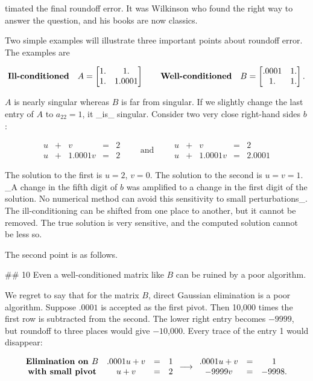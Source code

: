 timated the final roundoff error. It was Wilkinson who found the right way to answer the question, and his books are now classics.

Two simple examples will illustrate three important points about roundoff error. The examples are

\[\mbox{\bf Ill-conditioned}\quad A=\begin{bmatrix}1.&1.\\ 1.&1.0001\end{bmatrix}\qquad\mbox{\bf Well-conditioned}\quad B=\begin{bmatrix}.0001&1. \\ 1.&1.\end{bmatrix}.\]

\(A\) is nearly singular whereas \(B\) is far from singular. If we slightly change the last entry of \(A\) to \(a_{22}=1\), it _is_ singular. Consider two very close right-hand sides \(b\):

\[\begin{array}{ccccccc}u&+&v&=&2\\ u&+&1.0001v&=&2\end{array}\qquad\mbox{and}\qquad\begin{array}{ccccccc}u&+&v&=& 2\\ u&+&1.0001v&=&2.0001\end{array}\]

The solution to the first is \(u=2\), \(v=0\). The solution to the second is \(u=v=1\). _A change in the fifth digit of \(b\) was amplified to a change in the first digit of the solution. No numerical method can avoid this sensitivity to small perturbations_. The ill-conditioning can be shifted from one place to another, but it cannot be removed. The true solution is very sensitive, and the computed solution cannot be less so.

The second point is as follows.

## 10 Even a well-conditioned matrix like \(B\) can be ruined by a poor algorithm.

We regret to say that for the matrix \(B\), direct Gaussian elimination is a poor algorithm. Suppose \(.0001\) is accepted as the first pivot. Then 10,000 times the first row is subtracted from the second. The lower right entry becomes \(-9999\), but roundoff to three places would give \(-10\),000. Every trace of the entry 1 would disappear:

\[\begin{array}{ccccccc}\mbox{\bf Elimination on }B&.0001u+v&=&1\\ \mbox{\bf with small pivot}&u+v&=&2\end{array}\longrightarrow\begin{array}{ ccc}.0001u+v&=&1\\ -9999v&=&-9998.\end{array}\]

